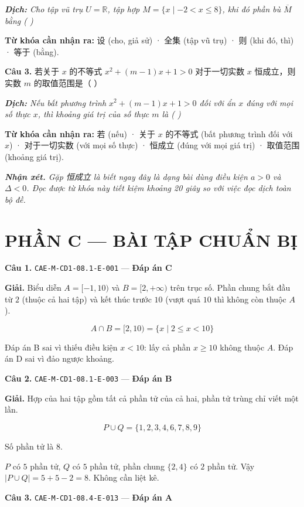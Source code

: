 \documentclass[11pt, a4paper]{article}
\begin{document}
\noindent\emph{\textbf{Dịch:} Cho tập vũ trụ $U = \mathbb{R}$, tập hợp $M = \{x \mid -2 < x \le 8\}$, khi đó phần bù $\overline{M}$ bằng ( )}

\textbf{Từ khóa cần nhận ra:} 设 (cho, giả sử) · 全集 (tập vũ trụ) · 则 (khi đó, thì) · 等于 (bằng).

\textbf{Câu 3.} 若关于 $x$ 的不等式 $x^2+(m-1)x+1>0$ 对于一切实数 $x$ 恒成立，则实数 $m$ 的取值范围是（ ）

\noindent\emph{\textbf{Dịch:} Nếu bất phương trình $x^2 + (m-1)x + 1 > 0$ đối với ẩn $x$ đúng với mọi số thực $x$, thì khoảng giá trị của số thực $m$ là ( )}

\textbf{Từ khóa cần nhận ra:} 若 (nếu) · 关于 $x$ 的不等式 (bất phương trình đối với $x$) · 对于一切实数 (với mọi số thực) · 恒成立 (đúng với mọi giá trị) · 取值范围 (khoảng giá trị).

\noindent\emph{\textbf{Nhận xét.} Gặp 恒成立 là biết ngay đây là dạng bài dùng điều kiện $a > 0$ và $\Delta < 0$. Đọc được từ khóa này tiết kiệm khoảng 20 giây so với việc đọc dịch toàn bộ đề.}

\section{PHẦN C — BÀI TẬP CHUẨN BỊ}

\textbf{Câu 1.} \texttt{CAE-M-CD1-08.1-E-001} — \textbf{Đáp án C}

\textbf{Giải.} Biểu diễn $A = [-1, 10)$ và $B = [2, +\infty)$ trên trục số. Phần chung bắt đầu từ $2$ (thuộc cả hai tập) và kết thúc trước $10$ (vượt quá $10$ thì không còn thuộc $A$).

$$A \cap B = [2, 10) = \{x \mid 2 \le x < 10\}$$

 Đáp án B sai vì thiếu điều kiện $x < 10$: lấy cả phần $x \ge 10$ không thuộc $A$. Đáp án D sai vì đảo ngược khoảng.

\textbf{Câu 2.} \texttt{CAE-M-CD1-08.1-E-003} — \textbf{Đáp án B}

\textbf{Giải.} Hợp của hai tập gồm tất cả phần tử của cả hai, phần tử trùng chỉ viết một lần.

$$P \cup Q = \{1, 2, 3, 4, 6, 7, 8, 9\}$$

Số phần tử là $8$.

 $P$ có $5$ phần tử, $Q$ có $5$ phần tử, phần chung $\{2,4\}$ có $2$ phần tử. Vậy $|P \cup Q| = 5 + 5 - 2 = 8$. Không cần liệt kê.

\textbf{Câu 3.} \texttt{CAE-M-CD1-08.4-E-013} — \textbf{Đáp án A}
\end{document}
